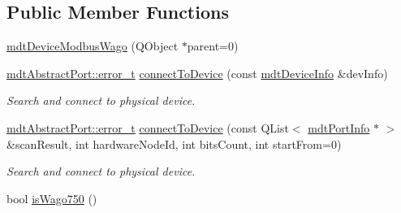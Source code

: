 \subsection*{Public Member Functions}
\begin{DoxyCompactItemize}
\item 
\hyperlink{classmdt_device_modbus_wago_a31abb03678a8afe2e6bf7c03e5e92726}{mdtDeviceModbusWago} (QObject $\ast$parent=0)
\item 
\hyperlink{classmdt_abstract_port_ad4121bb930c95887e77f8bafa065a85e}{mdtAbstractPort::error\_\-t} \hyperlink{classmdt_device_modbus_wago_a025f0411a708a529054a0e3c0b6461cd}{connectToDevice} (const \hyperlink{classmdt_device_info}{mdtDeviceInfo} \&devInfo)
\begin{DoxyCompactList}\small\item\em Search and connect to physical device. \end{DoxyCompactList}\item 
\hyperlink{classmdt_abstract_port_ad4121bb930c95887e77f8bafa065a85e}{mdtAbstractPort::error\_\-t} \hyperlink{classmdt_device_modbus_wago_a12ad1f1ef34b16be5903d1d6232a7c6d}{connectToDevice} (const QList$<$ \hyperlink{classmdt_port_info}{mdtPortInfo} $\ast$ $>$ \&scanResult, int hardwareNodeId, int bitsCount, int startFrom=0)
\begin{DoxyCompactList}\small\item\em Search and connect to physical device. \end{DoxyCompactList}\item 
\hypertarget{classmdt_device_modbus_wago_a6f01ba89d90ddfbcaa0cbda1885d22f1}{
bool \hyperlink{classmdt_device_modbus_wago_a6f01ba89d90ddfbcaa0cbda1885d22f1}{isWago750} ()}
\label{classmdt_device_modbus_wago_a6f01ba89d90ddfbcaa0cbda1885d22f1}


\end{DoxyCompactItemize}
